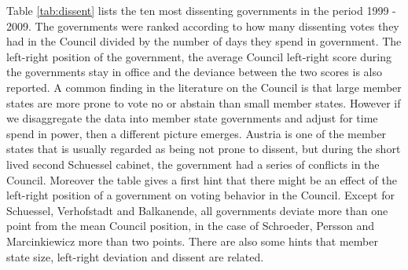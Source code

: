 \begin{table*}[ht]
\begin{center}
\end{center}
\caption{The Distribution of Votes Across Council Configurations}
\label{tab:depvar}
\end{table*}

Table \ref{tab:dissent} lists the ten most dissenting governments in the period 1999 - 2009. The governments were ranked according to how many dissenting votes they had in the Council divided by the number of days they spend in government. The left-right position of the government, the average Council left-right score during the governments stay in office and the deviance between the two scores is also reported. A common finding in the literature on the Council is that large member states are more prone to vote no or abstain than small member states. However if we disaggregate the data into member state governments and adjust for time spend in power, then a different picture emerges. Austria is one of the member states that is usually regarded as being not prone to dissent, but during the short lived second Schuessel cabinet, the government had a series of conflicts in the Council. Moreover the table gives a first hint that there might be an effect of the left-right position of a government on voting behavior in the Council. Except for Schuessel, Verhofstadt and Balkanende, all governments deviate more than one point from the mean Council position, in the case of Schroeder, Persson and Marcinkiewicz more than two points. There are also some hints that member state size, left-right deviation and dissent are related. 


